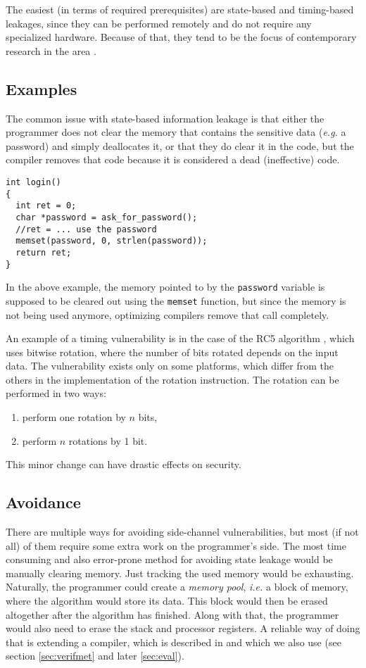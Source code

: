 \documentclass[a4paper,10pt,openright]{memoir}
\newcommand{\ie}{\emph{i.e.}\xspace}
\newcommand{\eg}{\emph{e.g.}\xspace}
\newcommand{\term}[1]{\textit{#1}}
\newcommand{\code}[1]{\texttt{#1}}
\begin{document}
The easiest (in terms of required prerequisites) are state-based and 
timing-based leakages, since they can be performed remotely and do not 
require any specialized hardware. Because of that, they tend to be the 
focus of contemporary research in the area 
\cite{BondEtal:2017:Vale}\cite{whatyouc}.

\subsection{Examples}

The common issue with state-based information leakage is that either 
the programmer does not clear the memory that contains the sensitive 
data (\eg a password) and simply deallocates it, or that they do clear 
it in the code, but the compiler removes that code because it is 
considered a dead (ineffective) code.

\begin{lstlisting}
int login()
{
  int ret = 0;
  char *password = ask_for_password();
  //ret = ... use the password
  memset(password, 0, strlen(password));
  return ret;
}
\end{lstlisting}

In the above example, the memory pointed to by the \code{password} 
variable is supposed to be cleared out using the \code{memset} 
function, but since the memory is not being used anymore, optimizing 
compilers remove that call completely\cite{whatyouc}.

An example of a timing vulnerability is in the case of the RC5 
algorithm \cite{TimingRC5}, which uses bitwise rotation, where the 
number of bits rotated depends on the input data. The vulnerability 
exists only on some platforms, which differ from the others in the 
implementation of the rotation instruction. The rotation can be 
performed in two ways: 
\begin{enumerate}
\item perform one rotation by $n$ bits,
\item perform $n$ rotations by 1 bit.
\end{enumerate}
This minor change can have drastic effects on security.

\subsection{Avoidance}

There are multiple ways for avoiding side-channel vulnerabilities, but 
most (if not all) of them require some extra work on the programmer's 
side. The most time consuming and also error-prone method for avoiding 
state leakage would be manually clearing memory. Just tracking the used 
memory would be exhausting. Naturally, the programmer could create a 
\term{memory pool}, \ie a block of memory, where the algorithm would 
store its data. This block would then be erased altogether after the 
algorithm has finished. Along with that, the programmer would also need 
to erase the stack and processor registers. A reliable way of doing 
that is extending a compiler, which is described in \cite{whatyouc} and 
which we also use (see section \ref{sec:verifmet} and later 
\ref{sec:eval}).
\end{document}
